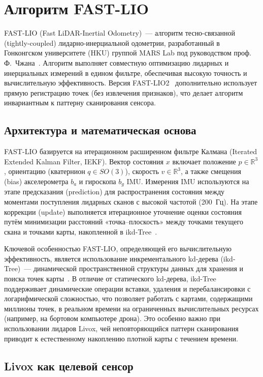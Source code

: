 \documentclass{misisarticle}
\begin{document}
\section{Алгоритм FAST-LIO}

FAST-LIO (Fast LiDAR-Inertial Odometry)~--- алгоритм тесно-связанной (tightly-coupled) лидарно-инерциальной одометрии, разработанный в Гонконгском университете (HKU) группой MARS Lab под руководством проф. Ф.~Чжана~\cite{xu2021}. Алгоритм выполняет совместную оптимизацию лидарных и инерциальных измерений в едином фильтре, обеспечивая высокую точность и вычислительную эффективность. Версия FAST-LIO2~\cite{xu2022} дополнительно использует прямую регистрацию точек (без извлечения признаков), что делает алгоритм инвариантным к паттерну сканирования сенсора.

\subsection{Архитектура и математическая основа}

FAST-LIO базируется на итерационном расширенном фильтре Калмана (Iterated Extended Kalman Filter, IEKF). Вектор состояния $x$ включает положение $p\in\mathbb{R}^3$, ориентацию (кватернион $q\in SO(3)$), скорость $v\in\mathbb{R}^3$, а также смещения (bias) акселерометра $b_a$ и гироскопа $b_g$ IMU. Измерения IMU используются на этапе предсказания (prediction) для распространения состояния между моментами поступления лидарных сканов с высокой частотой (200~Гц). На этапе коррекции (update) выполняется итерационное уточнение оценки состояния путём минимизации расстояний «точка--плоскость» между точками текущего скана и точками карты, накопленной в ikd-Tree~\cite{xu2021}.

Ключевой особенностью FAST-LIO, определяющей его вычислительную эффективность, является использование инкрементального kd-дерева (ikd-Tree)~--- динамической пространственной структуры данных для хранения и поиска точек карты~\cite{xu2021}. В отличие от статического kd-дерева, ikd-Tree поддерживает динамические операции вставки, удаления и перебалансировки с логарифмической сложностью, что позволяет работать с картами, содержащими миллионы точек, в реальном времени на ограниченных вычислительных ресурсах (например, на бортовом компьютере дрона). Это особенно важно при использовании лидаров Livox, чей неповторяющийся паттерн сканирования приводит к естественному накоплению плотной карты с течением времени.

\subsection{Livox как целевой сенсор}
\end{document}
